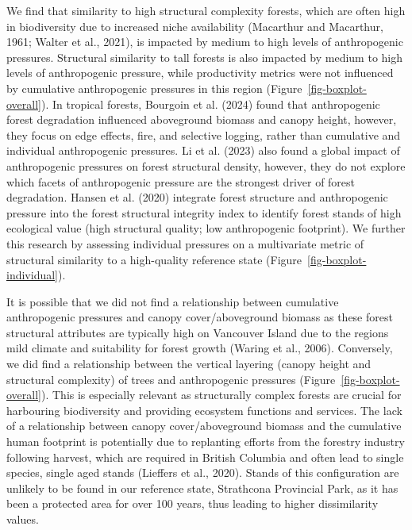 \documentclass[
]{agujournal2019}
\begin{document}
We find that similarity to high structural complexity forests, which are
often high in biodiversity due to increased niche availability
(Macarthur and Macarthur, 1961; Walter et al., 2021), is impacted by
medium to high levels of anthropogenic pressures. Structural similarity
to tall forests is also impacted by medium to high levels of
anthropogenic pressure, while productivity metrics were not influenced
by cumulative anthropogenic pressures in this region
(Figure~\ref{fig-boxplot-overall}). In tropical forests, Bourgoin et al.
(2024) found that anthropogenic forest degradation influenced
aboveground biomass and canopy height, however, they focus on edge
effects, fire, and selective logging, rather than cumulative and
individual anthropogenic pressures. Li et al. (2023) also found a global
impact of anthropogenic pressures on forest structural density, however,
they do not explore which facets of anthropogenic pressure are the
strongest driver of forest degradation. Hansen et al. (2020) integrate
forest structure and anthropogenic pressure into the forest structural
integrity index to identify forest stands of high ecological value (high
structural quality; low anthropogenic footprint). We further this
research by assessing individual pressures on a multivariate metric of
structural similarity to a high-quality reference state
(Figure~\ref{fig-boxplot-individual}).

It is possible that we did not find a relationship between cumulative
anthropogenic pressures and canopy cover/aboveground biomass as these
forest structural attributes are typically high on Vancouver Island due
to the regions mild climate and suitability for forest growth (Waring et
al., 2006). Conversely, we did find a relationship between the vertical
layering (canopy height and structural complexity) of trees and
anthropogenic pressures (Figure~\ref{fig-boxplot-overall}). This is
especially relevant as structurally complex forests are crucial for
harbouring biodiversity and providing ecosystem functions and services.
The lack of a relationship between canopy cover/aboveground biomass and
the cumulative human footprint is potentially due to replanting efforts
from the forestry industry following harvest, which are required in
British Columbia and often lead to single species, single aged stands
(Lieffers et al., 2020). Stands of this configuration are unlikely to be
found in our reference state, Strathcona Provincial Park, as it has been
a protected area for over 100 years, thus leading to higher
dissimilarity values.
\end{document}
